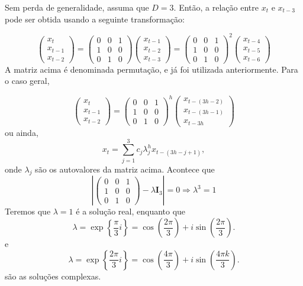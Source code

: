 \documentclass[
  letterpaper,
  DIV=11,
  numbers=noendperiod]{scrartcl}
\theoremstyle{plain}
\theoremstyle{plain}
\theoremstyle{definition}
\theoremstyle{definition}
\theoremstyle{remark}
\begin{document}
Sem perda de generalidade, assuma que \(D=3\). Então, a relação entre
\(x_t\) e \(x_{t-3}\) pode ser obtida usando a seguinte transformação:

\[\left(\begin{array}{c}x_t\\ x_{t-1}\\ x_{t-2}\end{array}\right)=\left(\begin{array}{cc}0 & 0 & 1\\ 1 & 0 & 0\\ 0& 1 & 0\end{array}\right)\left(\begin{array}{c}x_{t-1}\\ x_{t-2}\\ x_{t-3}\end{array}\right)=\left(\begin{array}{cc}0 & 0 & 1\\ 1 & 0 & 0\\ 0& 1 & 0\end{array}\right)^2\left(\begin{array}{c}x_{t-4}\\ x_{t-5}\\ x_{t-6}\end{array}\right)\]
A matriz acima é denominada permutação, e já foi utilizada
anteriormente. Para o caso geral,

\[\left(\begin{array}{c}x_t\\ x_{t-1}\\ x_{t-2}\end{array}\right)=\left(\begin{array}{cc}0 & 0 & 1\\ 1 & 0 & 0\\ 0& 1 & 0\end{array}\right)^h\left(\begin{array}{c}x_{t-(3h-2)}\\ x_{t-(3h-1)}\\ x_{t-3h}\end{array}\right)\]
ou ainda, \[x_t=\sum_{j=1}^3 c_j\lambda_j^h x_{t-(3h-j+1)},\] onde
\(\lambda_j\) são os autovalores da matriz acima. Acontece que
\[\left|\left(\begin{array}{cc}0 & 0 & 1\\ 1 & 0 & 0\\ 0& 1 & 0\end{array}\right)-\lambda \textbf{I}_3\right|=0\Rightarrow \lambda^3=1\]
Teremos que \(\lambda=1\) é a solução real, enquanto que
\[\lambda= \exp\left\{\frac{\pi }{3}i\right\}=\cos\left(\frac{2\pi }{3}\right)+i\sin\left(\frac{2\pi}{3}\right).\]
e
\[\lambda= \exp\left\{\frac{2\pi }{3}i\right\}=\cos\left(\frac{4\pi }{3}\right)+i\sin\left(\frac{4\pi k}{3}\right).\]
são as soluções complexas.
\end{document}

